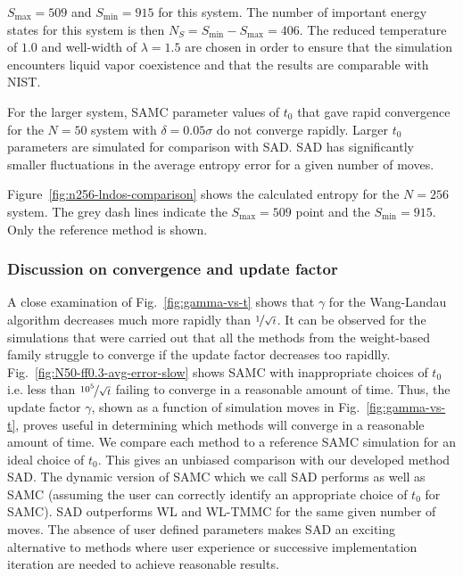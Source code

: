 \documentclass[letterpaper,twocolumn,amsmath,amssymb,pre,aps,10pt]{revtex4-1}
\begin{document}
{\color{red}
$S_{\max} = 509$ and $S_{\min} = 915$ for this system.  The number of
important energy states for this system is then $N_S = S_{\min} -
S_{\max} = 406$. The reduced temperature of $1.0$ and well-width of $\lambda = 1.5$
are chosen in order to ensure that the simulation encounters liquid vapor coexistence
and that the results are comparable with NIST.
}

For the larger system, SAMC parameter values of $t_0$ that gave rapid
convergence for the $N = 50$ system with $\delta = 0.05\sigma$ do not
converge rapidly.  Larger $t_0$ parameters are simulated for
comparison with SAD.  SAD has significantly smaller fluctuations
in the average entropy error for a given number of moves.

{\color{red}
Figure~\ref{fig:n256-lndos-comparison} shows the calculated entropy for
the $N = 256$ system. The grey dash lines indicate the $S_{\max} = 509$
point and the $S_{\min} = 915$. Only the reference method is shown.
}

\subsubsection{Discussion on convergence and update factor}

A close examination of Fig.~\ref{fig:gamma-vs-t} shows that $\gamma$
for the Wang-Landau algorithm decreases much more rapidly than
$\nicefrac{1}{\sqrt{t}}$. It can be observed  for the simulations that
were carried out that all the methods from the weight-based family
struggle to converge if the update factor decreases too rapidlly.
Fig.~\ref{fig:N50-ff0.3-avg-error-slow} shows SAMC with inappropriate choices
of $t_0$ i.e. less than $\nicefrac{10^5}{\sqrt{t}}$ failing to converge
in a reasonable amount of time. Thus, the update factor $\gamma$, shown
as a function of simulation moves in Fig.~\ref{fig:gamma-vs-t}, proves
useful in determining which methods will converge in a reasonable
amount of time. We compare each method to a reference SAMC
simulation for an ideal choice of $t_0$.  This gives an unbiased
comparison with our developed method SAD. The dynamic version of SAMC
which we call SAD performs as well as SAMC (assuming the user can
correctly identify an appropriate choice of $t_0$ for SAMC).  SAD
outperforms WL and WL-TMMC for the same given number of moves. The
absence of user defined parameters makes SAD an exciting alternative to
methods where user experience or successive implementation iteration
are needed to achieve reasonable results.
\end{document}
